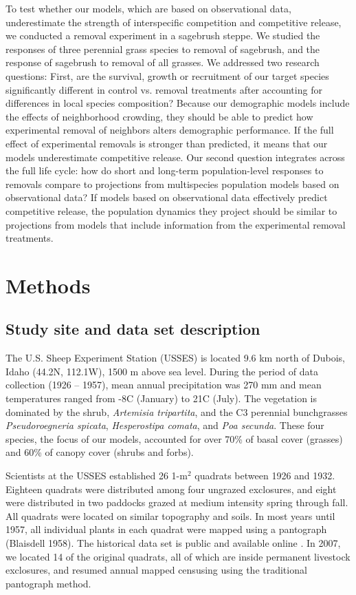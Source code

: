 \documentclass[11pt]{article}
\begin{document}
\begin{doublespacing}
To test whether our models, which are based on observational data, underestimate the strength of interspecific competition and competitive release, we conducted a removal experiment in a sagebrush steppe. We studied the responses of three perennial grass species to removal of sagebrush, and the response of sagebrush to removal of all grasses. We addressed two research questions: First, are the survival, growth or recruitment of our target species significantly different in control vs. removal treatments after accounting for differences in local species composition? Because our demographic models include the effects of neighborhood crowding, they should be able to predict how experimental removal of neighbors alters demographic performance. If the full effect of experimental removals is stronger than predicted, it means that our models underestimate competitive release.  Our second question integrates across the full life cycle: how do short and long-term population-level responses to removals compare to projections from multispecies population models based on observational data? If models based on observational data effectively predict competitive release, the population dynamics they project should be similar to projections from models that include information from the experimental removal treatments. 

\section*{Methods}

\subsection*{Study site and data set description}

The U.S. Sheep Experiment Station (USSES) is located 9.6 km north of Dubois, Idaho (44.2\degree N, 112.1\degree W), 1500 m above sea level. During the period of data collection (1926 – 1957), mean annual precipitation was 270 mm and mean temperatures ranged from -8\degree C (January) to 21\degree C (July). The vegetation is dominated by the shrub, \textit{Artemisia tripartita}, and the C3  perennial bunchgrasses \textit{Pseudoroegneria spicata}, \textit{Hesperostipa comata}, and \textit{Poa secunda}. These four species, the focus of our models, accounted for over 70\% of basal cover (grasses) and 60\% of canopy cover (shrubs and forbs). 

Scientists at the USSES established 26 1-m$^2$ quadrats between 1926 and 1932. Eighteen quadrats were distributed among four ungrazed exclosures, and eight were distributed in two paddocks grazed at medium intensity spring through fall. All quadrats were located on similar topography and soils. In most years until 1957, all individual plants in each quadrat were mapped using a pantograph (Blaisdell 1958). The historical data set is public and available online \citep{zachmann_mapped_2010}. In 2007, we located 14 of the original quadrats, all of which are inside permanent livestock exclosures, and resumed annual mapped censusing using the traditional pantograph method. 


\end{doublespacing}
\end{document}
